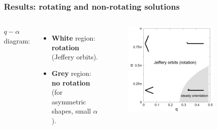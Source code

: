 \documentclass{beamer}
\newcommand{\bi}{\begin{itemize}}
\newcommand{\ei}{\end{itemize}}
\begin{document}



\begin{frame}
	\frametitle{Results: rotating and non-rotating solutions}
	\begin{overlayarea}{\textwidth}{\textheight}
		\vspace{-0.5cm}
		\begin{columns}
			\vspace{0.2cm}
			$q-\alpha$ diagram:
			\bi
		\item \textbf{White} region: \textbf{rotation} (Jeffery orbits). 
		\item \textbf{Grey} region: \textbf{no rotation} 
		(for asymmetric shapes, small $\alpha$). 
		\ei 
			\begin{figure}[htb]
				\begin{center}
					\includegraphics[width=0.85\textwidth]{plots/q_alpha_plot.png}
				\end{center}
			\end{figure}
		\end{columns}
		\vspace{0.5cm}
		\begin{columns}
			\column{.55\textwidth}
		\end{columns}
	\end{overlayarea}
\end{frame}
\end{document}
